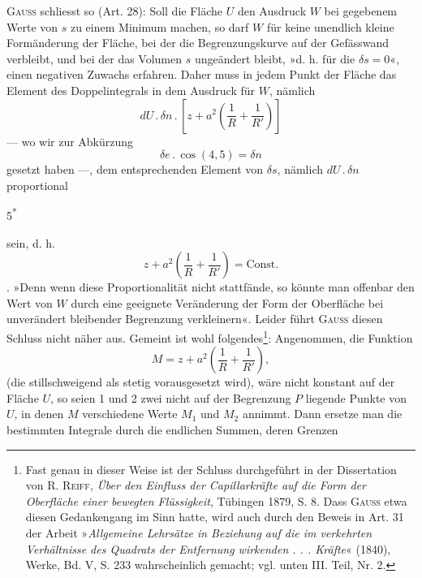 \textsc{Gauss} schliesst so (Art. 28): Soll die Fläche $U$ den Ausdruck $W$ bei gegebenem
Werte von $s$ zu einem Minimum machen, so darf $W$ für keine unendlich
kleine Formänderung der Fläche, bei der die Begrenzungskurve auf der
Gefässwand verbleibt, und bei der das Volumen $s$ ungeändert bleibt, »d. h.
für die $\delta s=0$«, einen negativen Zuwachs erfahren. Daher muss in jedem
Punkt der Fläche das Element des Doppelintegrals in dem Ausdruck für $W$,
nämlich
\[
dU\mathbin{.}\delta n\mathbin{.}\left[z+a^2\left(\frac{1}{R}+\frac{1}{R'}\right)\right]
\]
— wo wir zur Abkürzung
\begin{equation*}
\delta e\mathbin{.}\cos(4,5)=\delta n\tag{48}
\end{equation*}
gesetzt haben —, dem entsprechenden Element von $\delta s$, nämlich $dU\mathbin{.}\delta n$ proportional
\par\smallskip\noindent\hfill{\small 5\textsuperscript{*}}\par
\clearpage{}
\noindent sein, d. h. 
\begin{equation*}
z+a^2\left(\frac{1}{R}+\frac{1}{R'}\right)=\text{Const.}\tag{49}
\end{equation*}
. »Denn wenn diese Proportionalität nicht stattfände, so könnte man
offenbar den Wert von $W$ durch eine geeignete Veränderung der Form der
Oberfläche bei unverändert bleibender Begrenzung verkleinern«. Leider führt
\textsc{Gauss} diesen Schluss nicht näher aus. Gemeint ist wohl folgendes\footnote{Fast genau in dieser Weise ist der Schluss durchgeführt in der Dissertation von R. \textsc{Reiff}, \textit{Über
den Einfluss der Capillarkräfte auf die Form der Oberfläche einer bewegten Flüssigkeit}, Tübingen 1879,
S. 8. Dass \textsc{Gauss} etwa diesen Gedankengang im Sinn hatte, wird auch durch den Beweis in Art. 31 der
Arbeit »\textit{Allgemeine Lehrsätze in Beziehung auf die im verkehrten Verhältnisse des Quadrats der Entfernung
wirkenden . . . Kräfte}« (1840), Werke, Bd. V, S. 233 wahrscheinlich gemacht; vgl. unten III. Teil, Nr. 2.}: Angenommen,
die Funktion
\[
M=z+a^2\left(\frac{1}{R}+\frac{1}{R'}\right),
\]
(die stillschweigend als stetig vorausgesetzt wird), wäre nicht konstant auf der
Fläche $U$, so seien 1 und 2 zwei nicht auf der Begrenzung $P$ liegende Punkte
von $U$, in denen $M$ verschiedene Werte $M_1$ und $M_2$ annimmt. Dann ersetze
man die bestimmten Integrale durch die endlichen Summen, deren Grenzen
